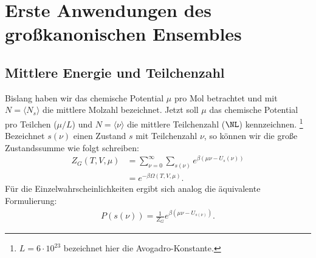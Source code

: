 \chapter{Erste Anwendungen des großkanonischen Ensembles}
\section{Mittlere Energie und Teilchenzahl}
Bislang haben wir das chemische Potential $\mu$ pro Mol betrachtet und mit $N=\langle N_s \rangle$ die mittlere Molzahl bezeichnet. Jetzt soll $\mu$ das chemische Potential pro Teilchen ($\mu/L$) und $N=\langle \nu \rangle$ die mittlere Teilchenzahl ($\NL$) kennzeichnen. \footnote{$L=6\cdot10^{23}$ bezeichnet hier die Avogadro-Konstante.} Bezeichnet $s(\nu)$ einen Zustand $s$ mit Teilchenzahl $\nu$, so können wir die große Zustandssumme wie folgt schreiben:
\begin{align*}
    Z_G(T,V,\mu)&=\sum_{\nu=0}^{\infty}\sum_{s(\nu)} e^{\beta(\mu \nu -U_s(\nu))}\\
    &=e^{-\beta \Omega(T,V,\mu)}.
\end{align*}
Für die Einzelwahrscheinlichkeiten 
ergibt sich analog die äquivalente Formulierung:
\begin{align*}
    P(s(\nu))=\frac{1}{Z_G}e^{\beta(\mu \nu-U_{s(\nu)})}.
\end{align*}
